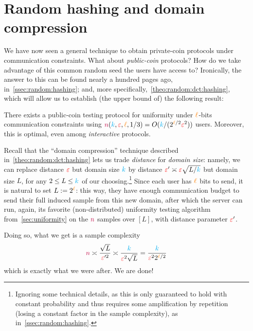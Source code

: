 \section{Random hashing and domain compression}
  \label{sec:domain:compression}
We have now seen a general technique to obtain private-coin protocols under communication constraints. What about \emph{public-coin} protocols? How do we take advantage of this common random seed the users have access to? Ironically, the answer to this can be found nearly a hundred pages ago, in~\cref{ssec:random:hashing}; and, more specifically,~\cref{theo:random:dct:hashing}, which will allow us to establish (the upper bound of) the following result:
\begin{theorem}
  \label{theo:public-coin}
There exists a public-coin testing protocol for uniformity under ${\textcolor{orange}{\ell}}$-bits communication constraints using ${\textcolor{purple}{n}}({\textcolor{cyan}{k}},\textcolor{red}{\varepsilon},{\textcolor{orange}{\ell}}, 1/3) = O({\textcolor{cyan}{k}}/(2^{{\textcolor{orange}{\ell}}/2} \textcolor{red}{\varepsilon}^2))$ users. Moreover, this is optimal, even among \emph{interactive} protocols.
\end{theorem}
Recall that the ``domain compression'' technique described in~\cref{theo:random:dct:hashing} lets us trade \emph{distance} for \emph{domain size}: namely, we can replace distance $\textcolor{red}{\varepsilon}$ but domain size ${\textcolor{cyan}{k}}$ by
distance $\textcolor{red}{\varepsilon}'\asymp\textcolor{red}{\varepsilon}\sqrt{L/{\textcolor{cyan}{k}}}$ but domain size $L$, for any $2\leq L\leq {\textcolor{cyan}{k}}$ of our choosing.\footnote{Ignoring some technical details, as this is only guaranteed to hold with constant probability and thus requires some amplification by repetition (losing a constant factor in the sample complexity), as in~\cref{ssec:random:hashing}.} Since each user has ${\textcolor{orange}{\ell}}$ bits to send, it is natural to set $L := 2^{\textcolor{orange}{\ell}}$: this way, they have enough communication budget to send their full induced sample from this new domain, after which the server can run, again, its favorite (non-distributed) uniformity testing algorithm from~\cref{sec:uniformity} on the ${\textcolor{purple}{n}}$ samples over $[L]$, with distance parameter $\textcolor{red}{\varepsilon}'$.

\noindent Doing so, what we get is a sample complexity
\begin{equation}
	{\textcolor{purple}{n}} \asymp \frac{\sqrt{L}}{\textcolor{red}{\varepsilon}'^2} \asymp \frac{{\textcolor{cyan}{k}}}{\textcolor{red}{\varepsilon}^2 \sqrt{L}} = \frac{{\textcolor{cyan}{k}}}{\textcolor{red}{\varepsilon}^22^{{\textcolor{orange}{\ell}}/2}}
\end{equation}
which is exactly what we were after. We are done!
